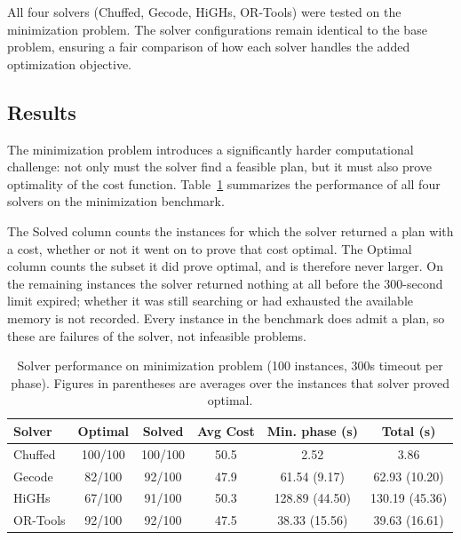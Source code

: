 \documentclass[a4paper,12pt]{article}
\begin{document}
All four solvers (Chuffed, Gecode, HiGHs, OR-Tools) were tested on the minimization problem. The solver configurations remain identical to the base problem, ensuring a fair comparison of how each solver handles the added optimization objective.

\subsection{Results}

The minimization problem introduces a significantly harder computational challenge: not only must the solver find a feasible plan, but it must also prove optimality of the cost function. Table~\ref{tab:min-solver-stats} summarizes the performance of all four solvers on the minimization benchmark.

The Solved column counts the instances for which the solver returned a plan with a cost, whether or not it went on to prove that cost optimal. The Optimal column counts the subset it did prove optimal, and is therefore never larger. On the remaining instances the solver returned nothing at all before the 300-second limit expired; whether it was still searching or had exhausted the available memory is not recorded. Every instance in the benchmark does admit a plan, so these are failures of the solver, not infeasible problems.

\begin{table}[H]
    \centering
    \caption{Solver performance on minimization problem (100 instances, 300s timeout per phase). Figures in parentheses are averages over the instances that solver proved optimal.}
    \label{tab:min-solver-stats}
    \begin{tabular}{|l|c|c|c|c|c|}
        \hline
        \textbf{Solver} & \textbf{Optimal} & \textbf{Solved} & \textbf{Avg Cost} & \textbf{Min. phase (s)} & \textbf{Total (s)} \\
        \hline
        Chuffed         & 100/100          & 100/100           & 50.5              & 2.52             & 3.86               \\
        Gecode          & 82/100           & 92/100            & 47.9              & 61.54 (9.17)     & 62.93 (10.20)      \\
        HiGHs           & 67/100           & 91/100            & 50.3              & 128.89 (44.50)   & 130.19 (45.36)     \\
        OR-Tools        & 92/100           & 92/100            & 47.5              & 38.33 (15.56)    & 39.63 (16.61)      \\
        \hline
    \end{tabular}
\end{table}
\end{document}
